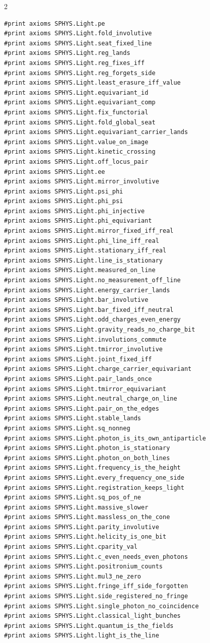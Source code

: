 \documentclass[10pt]{article}
\begin{document}
\begin{multicols}{2}
\begin{Verbatim}[fontsize=\fontsize{6.0}{6.9}\selectfont,breaklines,breakanywhere,breaksymbolleft={}]
#print axioms SPHYS.Light.pe
#print axioms SPHYS.Light.fold_involutive
#print axioms SPHYS.Light.seat_fixed_line
#print axioms SPHYS.Light.reg_lands
#print axioms SPHYS.Light.reg_fixes_iff
#print axioms SPHYS.Light.reg_forgets_side
#print axioms SPHYS.Light.least_erasure_iff_value
#print axioms SPHYS.Light.equivariant_id
#print axioms SPHYS.Light.equivariant_comp
#print axioms SPHYS.Light.fix_functorial
#print axioms SPHYS.Light.fold_global_seat
#print axioms SPHYS.Light.equivariant_carrier_lands
#print axioms SPHYS.Light.value_on_image
#print axioms SPHYS.Light.kinetic_crossing
#print axioms SPHYS.Light.off_locus_pair
#print axioms SPHYS.Light.ee
#print axioms SPHYS.Light.mirror_involutive
#print axioms SPHYS.Light.psi_phi
#print axioms SPHYS.Light.phi_psi
#print axioms SPHYS.Light.phi_injective
#print axioms SPHYS.Light.phi_equivariant
#print axioms SPHYS.Light.mirror_fixed_iff_real
#print axioms SPHYS.Light.phi_line_iff_real
#print axioms SPHYS.Light.stationary_iff_real
#print axioms SPHYS.Light.line_is_stationary
#print axioms SPHYS.Light.measured_on_line
#print axioms SPHYS.Light.no_measurement_off_line
#print axioms SPHYS.Light.energy_carrier_lands
#print axioms SPHYS.Light.bar_involutive
#print axioms SPHYS.Light.bar_fixed_iff_neutral
#print axioms SPHYS.Light.odd_charges_even_energy
#print axioms SPHYS.Light.gravity_reads_no_charge_bit
#print axioms SPHYS.Light.involutions_commute
#print axioms SPHYS.Light.tmirror_involutive
#print axioms SPHYS.Light.joint_fixed_iff
#print axioms SPHYS.Light.charge_carrier_equivariant
#print axioms SPHYS.Light.pair_lands_once
#print axioms SPHYS.Light.tmirror_equivariant
#print axioms SPHYS.Light.neutral_charge_on_line
#print axioms SPHYS.Light.pair_on_the_edges
#print axioms SPHYS.Light.stable_lands
#print axioms SPHYS.Light.sq_nonneg
#print axioms SPHYS.Light.photon_is_its_own_antiparticle
#print axioms SPHYS.Light.photon_is_stationary
#print axioms SPHYS.Light.photon_on_both_lines
#print axioms SPHYS.Light.frequency_is_the_height
#print axioms SPHYS.Light.every_frequency_one_side
#print axioms SPHYS.Light.registration_keeps_light
#print axioms SPHYS.Light.sq_pos_of_ne
#print axioms SPHYS.Light.massive_slower
#print axioms SPHYS.Light.massless_on_the_cone
#print axioms SPHYS.Light.parity_involutive
#print axioms SPHYS.Light.helicity_is_one_bit
#print axioms SPHYS.Light.cparity_val
#print axioms SPHYS.Light.c_even_needs_even_photons
#print axioms SPHYS.Light.positronium_counts
#print axioms SPHYS.Light.mul3_ne_zero
#print axioms SPHYS.Light.fringe_iff_side_forgotten
#print axioms SPHYS.Light.side_registered_no_fringe
#print axioms SPHYS.Light.single_photon_no_coincidence
#print axioms SPHYS.Light.classical_light_bunches
#print axioms SPHYS.Light.quantum_is_the_fields
#print axioms SPHYS.Light.light_is_the_line
\end{Verbatim}
\end{multicols}
\end{document}
